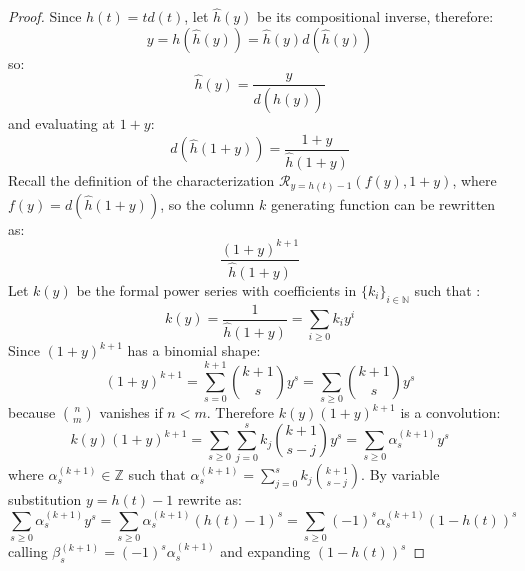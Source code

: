 \documentclass[11pt,a4paper]{article} %
\begin{document}
    \begin{proof}

    Since $h(t)=td(t)$, let $\hat{h}(y)$ be its compositional inverse, therefore:
    \begin{displaymath}
        y = h(\hat{h}(y)) = \hat{h}(y)d(\hat{h}(y)) 
    \end{displaymath}
    so:
    \begin{displaymath}
        \hat{h}(y) = \frac{y}{d(\hat{h}(y)) }
    \end{displaymath}
    and evaluating at $1+y$:
    \begin{displaymath}
        d(\hat{h}(1+y)) = \frac{1+y}{ \hat{h}(1+y)}
    \end{displaymath}
    Recall the definition of the characterization $\mathcal{R}_{y=h(t)-1}\left( f(y), 1+y \right)$,
    where $f(y)=d(\hat{h}(1+y))$, so the column $k$ generating function can be rewritten as:
    \begin{displaymath}
        \frac{(1+y)^{k+1}}{ \hat{h}(1+y)}
    \end{displaymath}
    Let $k(y)$ be the formal power series with coefficients in 
    $\lbrace k_i \rbrace_{i\in\mathbb{N}}$ such that :
    \begin{displaymath}
        k(y) = \frac{1}{ \hat{h}(1+y)} = \sum_{i\geq 0}{k_i}y^{i}
    \end{displaymath}
    Since $(1+y)^{k+1}$ has a binomial shape:
    \begin{displaymath}
        (1+y)^{k+1} = \sum_{s= 0}^{k+1}{{k+1}\choose{s}}y^{s}= \sum_{s\geq 0}{{k+1}\choose{s}}y^{s}
    \end{displaymath}
    because ${{n}\choose{m}}$ vanishes if $n<m$. Therefore $k(y)(1+y)^{k+1}$ is a convolution:
    \begin{displaymath}
        k(y)(1+y)^{k+1} = \sum_{s\geq 0}{\sum_{j=0}^{s}{k_j {{k+1}\choose{s-j}}} y^{s}} = 
            \sum_{s\geq 0}{\alpha_{s}^{(k+1)} y^{s}}
    \end{displaymath}
    where $\alpha_{s}^{(k+1)} \in \mathbb{Z}$ such that $\alpha_{s}^{(k+1)}=\sum_{j=0}^{s}{k_j {{k+1}\choose{s-j}}}$.
    By variable substitution $y = h(t)-1$ rewrite as:
    \begin{displaymath}
        \sum_{s\geq 0}{\alpha_{s}^{(k+1)} y^{s}}
            = \sum_{s\geq 0}{\alpha_{s}^{(k+1)} (h(t)-1)^{s}}
            = \sum_{s\geq 0}{(-1)^{s}\alpha_{s}^{(k+1)} (1-h(t))^{s}}
    \end{displaymath}
    calling $\beta_{s}^{(k+1)}=(-1)^{s}\alpha_{s}^{(k+1)}$ and expanding $(1-h(t))^{s}$

\end{proof}
\end{document}
